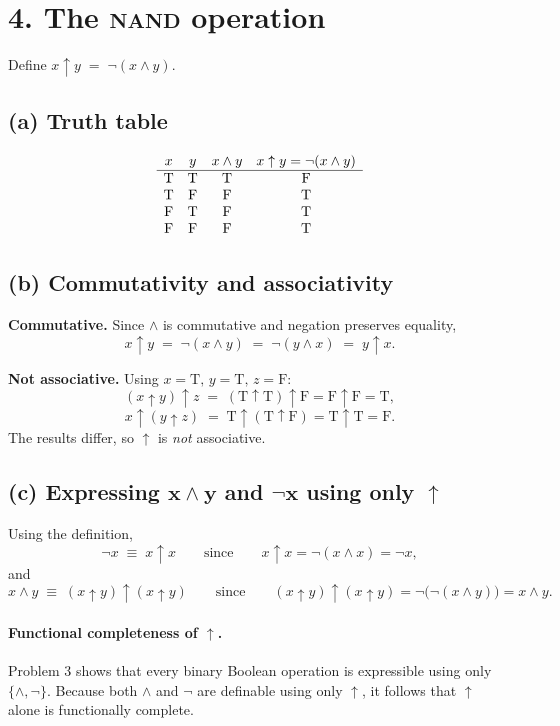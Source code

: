 \section*{4. The \textsc{nand} operation}

Define $x \uparrow y \;=\; \lnot(x \land y)$.

\subsection*{(a) Truth table}
\[
\begin{array}{c c c c}
x & y & x \land y & x \uparrow y=\lnot(x\land y)\\ \hline
\mathrm{T} & \mathrm{T} & \mathrm{T} & \mathrm{F}\\
\mathrm{T} & \mathrm{F} & \mathrm{F} & \mathrm{T}\\
\mathrm{F} & \mathrm{T} & \mathrm{F} & \mathrm{T}\\
\mathrm{F} & \mathrm{F} & \mathrm{F} & \mathrm{T}
\end{array}
\]

\subsection*{(b) Commutativity and associativity}
\textbf{Commutative.} Since $\land$ is commutative and negation preserves equality,
\[
x \uparrow y \;=\; \lnot(x\land y) \;=\; \lnot(y\land x) \;=\; y \uparrow x.
\]

\noindent
\textbf{Not associative.} Using $x=\mathrm{T},\,y=\mathrm{T},\,z=\mathrm{F}$:
\[
(x\uparrow y)\uparrow z \;=\; (\mathrm{T}\uparrow \mathrm{T})\uparrow \mathrm{F}
= \mathrm{F}\uparrow \mathrm{F} = \mathrm{T},
\]
\[
x\uparrow (y\uparrow z) \;=\; \mathrm{T}\uparrow (\mathrm{T}\uparrow \mathrm{F})
= \mathrm{T}\uparrow \mathrm{T} = \mathrm{F}.
\]
The results differ, so $\uparrow$ is \emph{not} associative.

\subsection*{(c) Expressing $\boldsymbol{x\land y}$ and $\boldsymbol{\lnot x}$ using only $\boldsymbol{\uparrow}$}
Using the definition,
\[
\lnot x \;\equiv\; x \uparrow x
\qquad\text{since}\qquad x\uparrow x=\lnot(x\land x)=\lnot x,
\]
and
\[
x\land y \;\equiv\; (x\uparrow y)\uparrow (x\uparrow y)
\qquad\text{since}\qquad (x\uparrow y)\uparrow (x\uparrow y)
= \lnot\bigl(\lnot(x\land y)\bigr)=x\land y.
\]

\paragraph{Functional completeness of $\uparrow$.}
Problem 3 shows that every binary Boolean operation is expressible using only $\{\land,\lnot\}$.
Because both $\land$ and $\lnot$ are definable using only $\uparrow$, it follows that $\uparrow$
alone is functionally complete.
